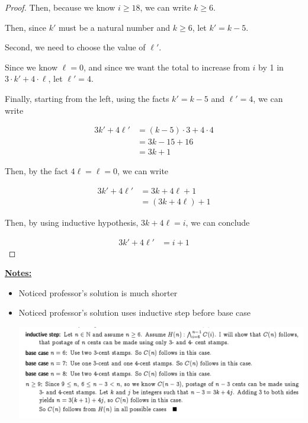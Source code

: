 \documentclass[12pt]{article}
\begin{document}
\begin{itemize}
\begin{proof}
    \bigskip

    Then, because we know $i \geq 18$, we can write $k \geq 6$.

    \bigskip

    Then, since $k'$ must be a natural number and $k \geq 6$, let $k' = k - 5$.

    \bigskip

    Second, we need to choose the value of $\ell'$.

    \bigskip

    Since we know $\ell = 0$, and since we want the total to increase from $i$ by 1
    in $3 \cdot k' + 4 \cdot \ell$, let $\ell' = 4$.

    \bigskip

    Finally, starting from the left, using the facts $k' = k - 5$ and $\ell' = 4$, we can write

    \begin{align}
    3k' + 4\ell' &= (k-5) \cdot 3 + 4 \cdot 4\\
    &= 3k - 15 + 16\\
    &= 3k + 1
    \end{align}

    \bigskip

    Then, by the fact $4\ell = \ell = 0$, we can write

    \begin{align}
    3k' + 4\ell' &= 3k + 4\ell + 1\\
    &= (3k + 4\ell) + 1
    \end{align}

    \bigskip

    Then, by using inductive hypothesis, $3k + 4\ell = i$, we can conclude

    \begin{align}
    3k' + 4\ell' &= i + 1
    \end{align}

    \end{proof}

    \bigskip

    \underline{\textbf{Notes:}}

    \bigskip

    \begin{itemize}
        \item Noticed professor's solution is much shorter
        \item Noticed professor's solution uses inductive step before base case

        \begin{center}
        \includegraphics[width=\linewidth]{images/worksheet_2_question_2_note_1.png}
        \end{center}


\end{itemize}
\end{itemize}
\end{document}

